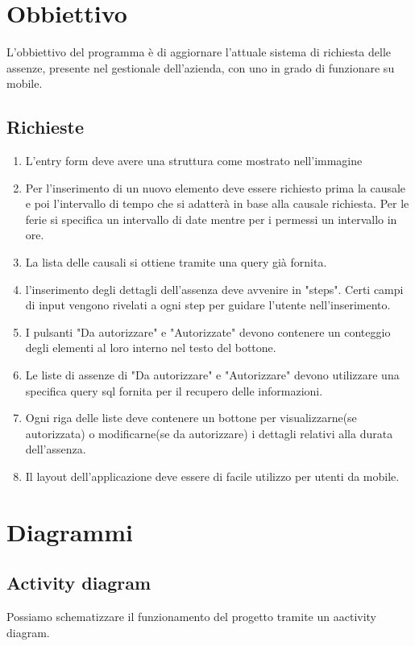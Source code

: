 \documentclass[target=bach,aauheader=,style=]{thud}
\begin{document}
\section{Obbiettivo}
L'obbiettivo del programma è di aggiornare l'attuale sistema di richiesta delle assenze, presente nel gestionale dell'azienda, con uno in grado di funzionare su mobile.

\subsection{Richieste}
\begin{enumerate}
    \item L'entry form deve avere una struttura come mostrato nell'immagine
    \item Per l'inserimento di un nuovo elemento deve essere richiesto prima la causale e poi l'intervallo di tempo che si adatterà in base alla causale richiesta.
    Per le ferie si specifica un intervallo di date mentre per i permessi un intervallo in ore.
    \item La lista delle causali si ottiene tramite una query già fornita.
    \item l'inserimento degli dettagli dell'assenza deve avvenire in "steps". Certi campi di input vengono rivelati a ogni step per guidare l'utente nell'inserimento.
    \item I pulsanti "Da autorizzare" e "Autorizzate" devono contenere un conteggio degli elementi al loro interno nel testo del bottone.
    \item Le liste di assenze di "Da autorizzare" e "Autorizzare" devono utilizzare una specifica query sql fornita per il recupero delle informazioni. 
    \item Ogni riga delle liste deve contenere un bottone per visualizzarne(se autorizzata) o modificarne(se da autorizzare) i dettagli relativi alla durata dell'assenza.
    \item Il layout dell'applicazione deve essere di facile utilizzo per utenti da mobile.
\end{enumerate}
\section{Diagrammi}%
\subsection{Activity diagram}
Possiamo schematizzare il funzionamento del progetto tramite un aactivity diagram.
\end{document}
